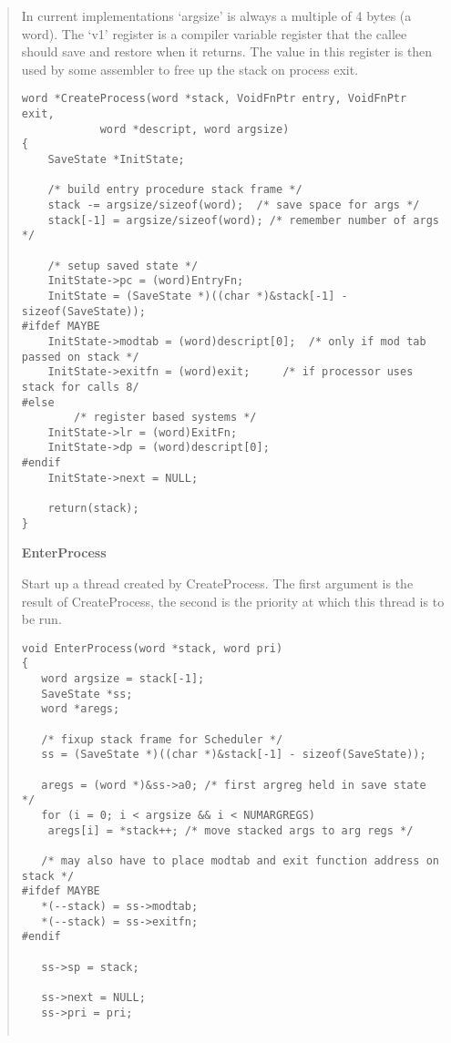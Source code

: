 \begin{enumerate}
\begin{quote}
\begin{sloppypar}
In current implementations `argsize' is always a multiple of 4 bytes (a word).
The `v1' register is a compiler variable register that the callee should save
and restore when it returns. The value in this register is then used by some
assembler to free up the stack on process exit.
\end{sloppypar}
\scriptsize
\begin{verbatim}
word *CreateProcess(word *stack, VoidFnPtr entry, VoidFnPtr exit, 
			word *descript, word argsize)
{
	SaveState *InitState;

	/* build entry procedure stack frame */
	stack -= argsize/sizeof(word);  /* save space for args */
	stack[-1] = argsize/sizeof(word); /* remember number of args */

	/* setup saved state */
	InitState->pc = (word)EntryFn;
	InitState = (SaveState *)((char *)&stack[-1] - sizeof(SaveState));
#ifdef MAYBE
	InitState->modtab = (word)descript[0];	/* only if mod tab passed on stack */
	InitState->exitfn = (word)exit;		/* if processor uses stack for calls 8/
#else
        /* register based systems */
	InitState->lr = (word)ExitFn;
	InitState->dp = (word)descript[0];
#endif
	InitState->next = NULL;

	return(stack);
}
\end{verbatim}
\normalsize

\item {\bf EnterProcess}

Start up a thread created by CreateProcess.
The first argument is the result of CreateProcess, the second is the priority
at which this thread is to be run.

\scriptsize
\begin{verbatim}
void EnterProcess(word *stack, word pri)
{
   word argsize = stack[-1];
   SaveState *ss;
   word *aregs;

   /* fixup stack frame for Scheduler */
   ss = (SaveState *)((char *)&stack[-1] - sizeof(SaveState));

   aregs = (word *)&ss->a0; /* first argreg held in save state */
   for (i = 0; i < argsize && i < NUMARGREGS)
	aregs[i] = *stack++; /* move stacked args to arg regs */

   /* may also have to place modtab and exit function address on stack */
#ifdef MAYBE
   *(--stack) = ss->modtab;
   *(--stack) = ss->exitfn;
#endif
  
   ss->sp = stack;

   ss->next = NULL;
   ss->pri = pri;


\end{verbatim}
\end{quote}
\end{enumerate}
